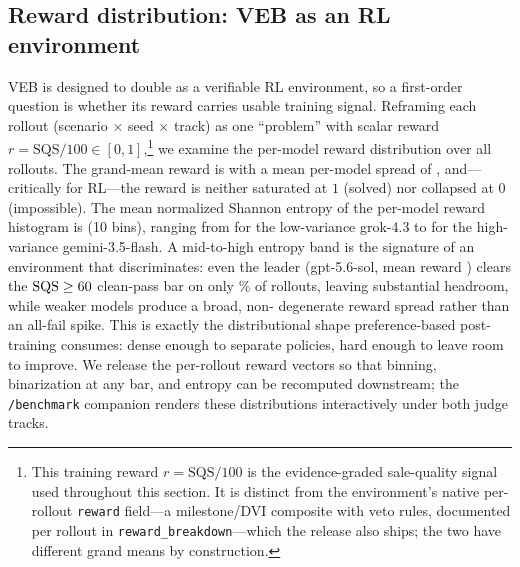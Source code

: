 \subsection{Reward distribution: VEB as an RL environment}
\label{sec:distribution}
VEB is designed to double as a verifiable RL environment, so a first-order question
is whether its reward carries usable training signal. Reframing each rollout
(scenario $\times$ seed $\times$ track) as one ``problem'' with scalar reward
$r=\mathrm{SQS}/100\in[0,1]$,\footnote{This training reward $r=\mathrm{SQS}/100$ is
the evidence-graded sale-quality signal used throughout this section. It is distinct
from the environment's native per-rollout \texttt{reward} field---a milestone/DVI
composite with veto rules, documented per rollout in \texttt{reward\_breakdown}---which
the release also ships; the two have different grand means by construction.} we
examine the per-model reward distribution over all
\gridCellsTotal{} rollouts. The grand-mean reward is \resDistGrandReward{} with a
mean per-model spread of \resDistMeanStd{}, and---critically for RL---the reward is
neither saturated at $1$ (solved) nor collapsed at $0$ (impossible). The mean
normalized Shannon entropy of the per-model reward histogram is
\resDistMeanEntropy{} (10 bins), ranging from \resDistEntropyLo{} for the
low-variance grok-4.3 to \resDistEntropyHi{} for the high-variance gemini-3.5-flash.
A mid-to-high entropy band is the signature of an environment that discriminates:
even the leader (gpt-5.6-sol, mean reward \resDistLeaderReward{}) clears the
$\mathrm{SQS}\ge60{}$ clean-pass bar on only \resDistLeaderPass{}\% of
rollouts, leaving substantial headroom, while weaker models produce a broad, non-
degenerate reward spread rather than an all-fail spike. This is exactly the
distributional shape preference-based post-training consumes: dense enough to
separate policies, hard enough to leave room to improve. We release the per-rollout
reward vectors so that binning, binarization at any bar, and entropy can be
recomputed downstream; the \texttt{/benchmark} companion renders these
distributions interactively under both judge tracks.
